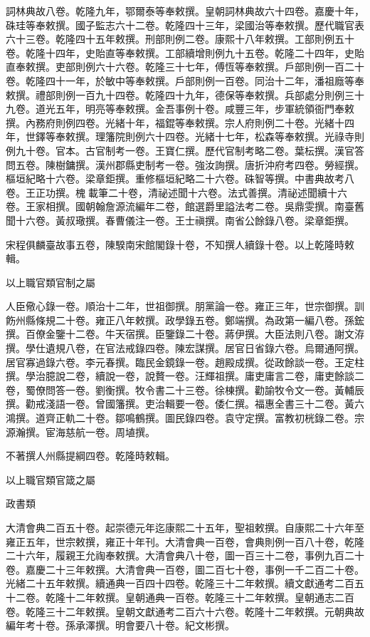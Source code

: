 \begin{pinyinscope}
詞林典故八卷。乾隆九年，鄂爾泰等奉敕撰。皇朝詞林典故六十四卷。嘉慶十年，硃珪等奉敕撰。國子監志六十二卷。乾隆四十三年，梁國治等奉敕撰。歷代職官表六十三卷。乾隆四十五年敕撰。刑部則例二卷。康熙十八年敕撰。工部則例五十卷。乾隆十四年，史貽直等奉敕撰。工部續增則例九十五卷。乾隆二十四年，史貽直奉敕撰。吏部則例六十六卷。乾隆三十七年，傅恆等奉敕撰。戶部則例一百二十卷。乾隆四十一年，於敏中等奉敕撰。戶部則例一百卷。同治十二年，潘祖廕等奉敕撰。禮部則例一百九十四卷。乾隆四十九年，德保等奉敕撰。兵部處分則例三十九卷。道光五年，明亮等奉敕撰。金吾事例十卷。咸豐三年，步軍統領衙門奉敕撰。內務府則例四卷。光緒十年，福錕等奉敕撰。宗人府則例二十卷。光緒十四年，世鐸等奉敕撰。理籓院則例六十四卷。光緒十七年，松森等奉敕撰。光祿寺則例九十卷。官本。古官制考一卷。王寶仁撰。歷代官制考略二卷。葉枟撰。漢官答問五卷。陳樹鏞撰。漢州郡縣吏制考一卷。強汝詢撰。唐折沖府考四卷。勞經撰。樞垣紀略十六卷。梁章鉅撰。重修樞垣紀略二十六卷。硃智等撰。中書典故考八卷。王正功撰。槐載筆二十卷，清祕述聞十六卷。法式善撰。清祕述聞續十六卷。王家相撰。國朝翰詹源流編年二卷，館選爵里謚法考二卷。吳鼎雯撰。南臺舊聞十六卷。黃叔璥撰。春曹儀注一卷。王士禛撰。南省公餘錄八卷。梁章鉅撰。

宋程俱麟臺故事五卷，陳騤南宋館閣錄十卷，不知撰人續錄十卷。以上乾隆時敕輯。

以上職官類官制之屬

人臣儆心錄一卷。順治十二年，世祖御撰。朋黨論一卷。雍正三年，世宗御撰。訓飭州縣條規二十卷。雍正八年敕撰。政學錄五卷。鄭端撰。為政第一編八卷。孫鋐撰。百僚金鑒十二卷。牛天宿撰。臣鑒錄二十卷。蔣伊撰。大臣法則八卷。謝文洊撰。學仕遺規八卷，在官法戒錄四卷。陳宏謀撰。居官日省錄六卷。烏爾通阿撰。居官寡過錄六卷。李元春撰。臨民金鏡錄一卷。趙殿成撰。從政餘談一卷。王定柱撰。學治臆說二卷，續說一卷，說贅一卷。汪輝祖撰。庸吏庸言二卷，庸吏餘談二卷，蜀僚問答一卷。劉衡撰。牧令書二十三卷。徐棟撰。勸諭牧令文一卷。黃輔辰撰。勸戒淺語一卷。曾國籓撰。吏治輯要一卷。倭仁撰。福惠全書三十二卷。黃六鴻撰。道齊正軌二十卷。鄒鳴鶴撰。圖民錄四卷。袁守定撰。富教初桄錄二卷。宗源瀚撰。宦海慈航一卷。周埴撰。

不著撰人州縣提綱四卷。乾隆時敕輯。

以上職官類官箴之屬

政書類

大清會典二百五十卷。起崇德元年迄康熙二十五年，聖祖敕撰。自康熙二十六年至雍正五年，世宗敕撰，雍正十年刊。大清會典一百卷，會典則例一百八十卷，乾隆二十六年，履親王允祹奉敕撰。大清會典八十卷，圖一百三十二卷，事例九百二十卷。嘉慶二十三年敕撰。大清會典一百卷，圖二百七十卷，事例一千二百二十卷。光緒二十五年敕撰。續通典一百四十四卷。乾隆三十二年敕撰。續文獻通考二百五十二卷。乾隆十二年敕撰。皇朝通典一百卷。乾隆三十二年敕撰。皇朝通志二百卷。乾隆三十二年敕撰。皇朝文獻通考二百六十六卷。乾隆十二年敕撰。元朝典故編年考十卷。孫承澤撰。明會要八十卷。紀文彬撰。


\end{pinyinscope}
